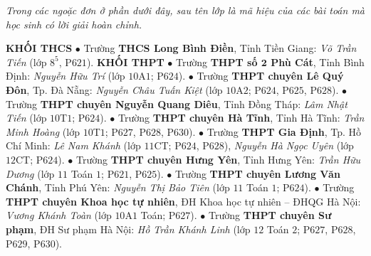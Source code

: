 \textit{Trong các ngoặc đơn ở phần dưới đây, sau tên lớp là mã hiệu của các bài toán mà học sinh có lời giải hoàn chỉnh.}
\begin{multicols}{2}
	\textbf{\color{thachthuctoanhoc}KHỐI THCS}
	\vskip 0.05cm
	$\bullet$ Trường \textbf{\color{thachthuctoanhoc}THCS Long Bình Điền}, Tỉnh Tiền Giang: \textit{Võ Trần Tiến} (lớp $8^5$,  P$621$).
	\vskip 0.05cm
	\textbf{\color{thachthuctoanhoc}KHỐI THPT}
	\vskip 0.05cm
	$\bullet$ Trường \textbf{\color{thachthuctoanhoc}THPT số $\pmb{2}$ Phù Cát}, Tỉnh Bình Định: \textit{Nguyễn Hữu Trí} (lớp $10$A$1$; P$624$).
	\vskip 0.05cm
	$\bullet$ Trường \textbf{\color{thachthuctoanhoc}THPT chuyên Lê Quý Đôn}, Tp. Đà Nẵng: \textit{Nguyễn Châu Tuấn Kiệt} (lớp $10$A$2$; P$624$, P$625$, P$628$).
	\vskip 0.05cm
	$\bullet$ Trường \textbf{\color{thachthuctoanhoc}THPT chuyên Nguyễn Quang Diêu}, Tỉnh Đồng Tháp: \textit{Lâm Nhật Tiến} (lớp $10$T$1$; P$624$).
	\vskip 0.05cm
	$\bullet$ Trường \textbf{\color{thachthuctoanhoc}THPT chuyên Hà Tĩnh}, Tỉnh Hà Tĩnh: \textit{Trần Minh Hoàng} (lớp $10$T$1$; P$627$, P$628$, P$630$).
	\vskip 0.05cm
	$\bullet$ Trường \textbf{\color{thachthuctoanhoc}THPT Gia Định}, Tp. Hồ Chí Minh: \textit{Lê Nam Khánh} (lớp $11$CT; P$624$, P$628$), \textit{Nguyễn Hà Ngọc Uyên} (lớp $12$CT; P$624$).
	\vskip 0.05cm
	$\bullet$ Trường \textbf{\color{thachthuctoanhoc}THPT chuyên Hưng Yên}, Tỉnh Hưng Yên: \textit{Trần Hữu Dương} (lớp $11$ Toán $1$; P$621$, P$625$).
	\vskip 0.05cm
	$\bullet$ Trường \textbf{\color{thachthuctoanhoc}THPT chuyên Lương Văn Chánh}, Tỉnh Phú Yên: \textit{Nguyễn Thị Bảo Tiên} (lớp $11$ Toán $1$; P$624$).
	\vskip 0.05cm
	$\bullet$ Trường \textbf{\color{thachthuctoanhoc}THPT chuyên Khoa học tự nhiên}, ĐH Khoa học tự nhiên -- ĐHQG Hà Nội: \textit{Vương Khánh Toàn} (lớp $10$A$1$ Toán; P$627$).
	\vskip 0.05cm
	$\bullet$ Trường \textbf{\color{thachthuctoanhoc}THPT chuyên Sư phạm}, ĐH Sư phạm Hà Nội: \textit{Hồ Trần Khánh Linh} (lớp $12$ Toán $2$; P$627$, P$628$, P$629$, P$630$).
\end{multicols}

